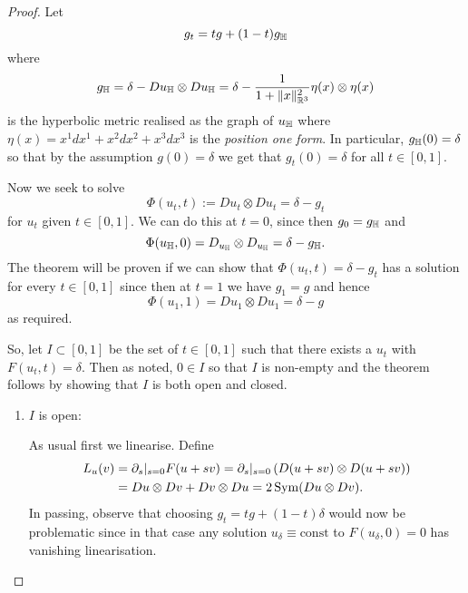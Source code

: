 \documentclass[a4paper, 12pt]{amsart}
\begin{document}
\begin{proof}
Let
\[
g_t = t g + (1-t) g_{\mathbb{H}}
\]
where
\[
g_{\mathbb{H}} = \delta - Du_{\mathbb{H}} \otimes Du_{\mathbb{H}} = \delta - \frac{1}{1 + \|x\|_{\mathbb{R}^3}^2} \eta(x) \otimes \eta(x)
\]
is the hyperbolic metric realised as the graph of \(u_{\mathbb{H}}\) where \(\eta(x) = x^1 dx^1 + x^2 dx^2 + x^3 dx^3\) is the \emph{position one form}. In particular, \(g_{\mathbb{H}} (0) = \delta\) so that by the assumption \(g(0) = \delta\) we get that \(g_t(0) = \delta\) for all \(t \in [0, 1]\).

Now we seek to solve
\[
\Phi(u_t, t) := Du_t \otimes Du_t = \delta - g_t
\]
for \(u_t\) given \(t \in [0, 1]\). We can do this at \(t = 0\), since then \(g_0 = g_{\mathbb{H}}\) and
\[
\Phi(u_{\mathbb{H}}, 0) = D_{u_{\mathbb{H}}} \otimes D_{u_{\mathbb{H}}} = \delta - g_{\mathbb{H}}.
\]
The theorem will be proven if we can show that \(\Phi(u_t, t) = \delta - g_t\) has a solution for every \(t \in [0, 1]\) since then at \(t = 1\) we have \(g_1 = g\) and hence
\[
\Phi(u_1, 1) = Du_1 \otimes Du_1 = \delta - g
\]
as required.

So, let \(I \subset [0, 1]\) be the set of \(t \in [0, 1]\) such that there exists a \(u_t\) with \(F(u_t, t) = \delta\). Then as noted, \(0 \in I\) so that \(I\) is non-empty and the theorem follows by showing that \(I\) is both open and closed.

\begin{enumerate}
\item \(I\) is open:

As usual first we linearise. Define
\[
\begin{split}
L_u (v) &= \partial_s|_{s=0} F(u + sv) = \partial_s|_{s=0} \left(D(u + sv) \otimes D(u + sv)\right) \\
&= Du \otimes Dv + Dv \otimes Du = 2 \operatorname{Sym} (Du \otimes Dv).
\end{split}
\]
In passing, observe that choosing \(g_t = t g + (1-t)\delta\) would now be problematic since in that case any solution \(u_{\delta} \equiv \text{const}\) to \(F(u_{\delta}, 0) = 0\) has vanishing linearisation.


\end{enumerate}
\end{proof}
\end{document}
